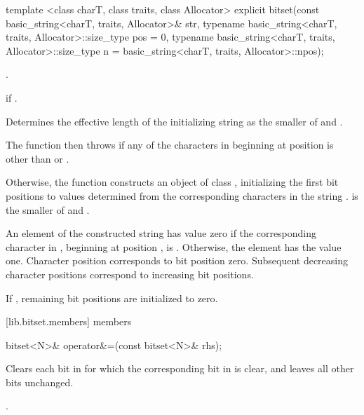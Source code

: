 \begin{itemdecl}
template <class charT, class traits, class Allocator>
explicit
bitset(const basic_string<charT, traits, Allocator>& str,
       typename basic_string<charT, traits, Allocator>::size_type pos = 0,
       typename basic_string<charT, traits, Allocator>::size_type n =
         basic_string<charT, traits, Allocator>::npos);
\end{itemdecl}

\begin{itemdescr}
\pnum
\requires
{}.

\pnum
\throws
{}
if
.%

\pnum
\effects
Determines the effective length
 of the initializing string as the smaller of
 and
.

The function then throws%
if any of the 
characters in  beginning at position  is
other than  or .

Otherwise, the function constructs an object of class
,
initializing the first  bit
positions to values determined from the corresponding characters in the string
.
 is the smaller of  and .

\pnum
An element of the constructed string has value zero if the
corresponding character in , beginning at position
, is
.
Otherwise, the element has the value one.
Character position  corresponds to bit position zero.
Subsequent decreasing character positions correspond to increasing bit positions.

\pnum
If , remaining bit positions are initialized to zero.
\end{itemdescr}


[lib.bitset.members]{ members}

%
\begin{itemdecl}
bitset<N>& operator&=(const bitset<N>& rhs);
\end{itemdecl}

\begin{itemdescr}
\pnum
\effects
Clears each bit in
for which the corresponding bit in  is clear, and leaves all other bits unchanged.

\pnum
\returns
{}.
\end{itemdescr}

